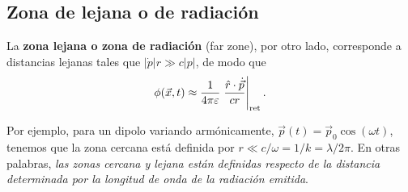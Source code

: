 \subsection{Zona de lejana o de radiación}
La \textbf{zona lejana o zona de radiación} (far zone), por otro lado, corresponde a distancias lejanas tales que $|\dot{p}|r\gg c|p|$, de modo que
\begin{equation}
\phi(\vec{x},t)\approx\frac{1}{4\pi\varepsilon}\left.\frac{\hat{r}\cdot\dot{\vec{p}}}{cr}\right|_{\rm ret}.
\end{equation}

Por ejemplo, para un dipolo variando armónicamente, $\vec{p}(t)=\vec{p}_0\cos(\omega t)$, tenemos que la zona cercana está definida por $r\ll c/\omega=1/k=\lambda/2\pi$. En otras palabras, \textit{las zonas cercana y lejana están definidas respecto de la distancia determinada por la longitud de onda de la radiación emitida}.

